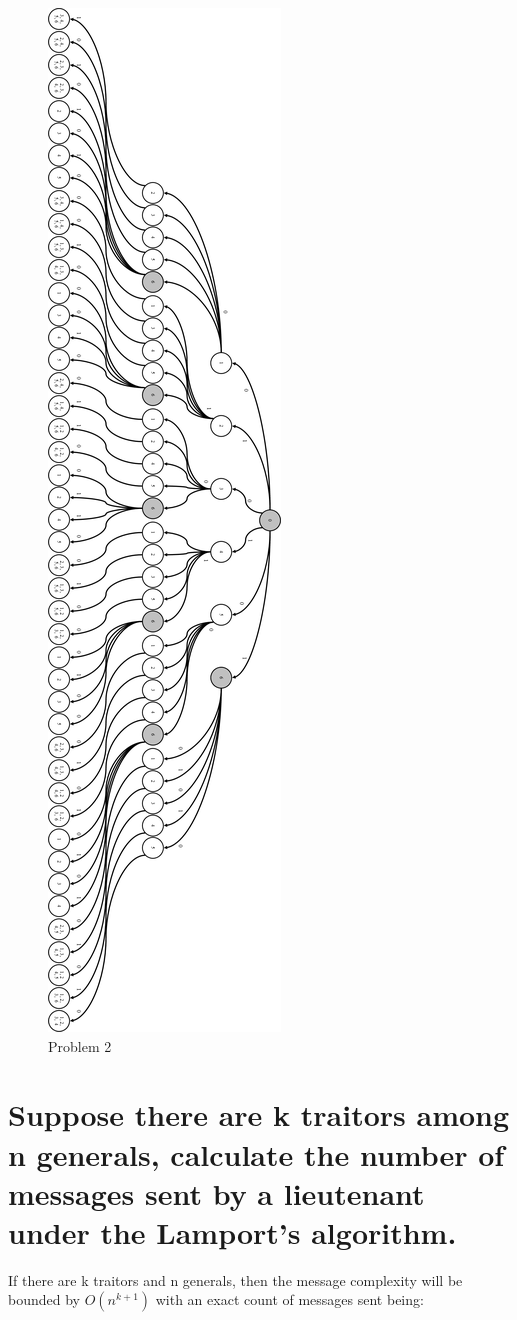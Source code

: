 \documentclass[times]{article}
\begin{document}
		\begin{figure}[H]
			\caption{Problem 2}
			\includegraphics[height=\textheight]{q2.png}
		\end{figure}
	\section{Suppose there are k traitors among n generals, calculate the number of messages sent by a lieutenant under the Lamport’s algorithm.}
		If there are k traitors and n generals, then the message complexity will be bounded by $O(n^{k+1})$ with an exact count of messages sent being:
\end{document}
